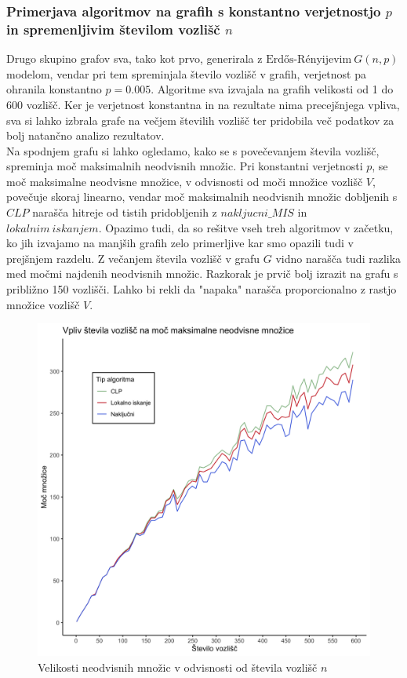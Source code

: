 \documentclass[a4paper, 12pt]{article}
\begin{document}
\subsubsection{Primerjava algoritmov na grafih s konstantno verjetnostjo $p$ in spremenljivim številom vozlišč $n$}

Drugo skupino grafov sva, tako kot prvo, generirala z $\text{Erdős-Rényijevim}\ G(n, p)$ modelom, vendar pri tem spreminjala število vozlišč v grafih, verjetnost pa ohranila konstantno $p=0.005$.
Algoritme sva izvajala na grafih velikosti od 1 do 600 vozlišč. Ker je verjetnost konstantna in na rezultate nima precejšnjega vpliva, sva si lahko izbrala grafe na večjem številih vozlišč ter pridobila več podatkov za bolj natančno analizo rezultatov.\\

\noindent Na spodnjem grafu si lahko ogledamo, kako se s povečevanjem števila vozlišč, spreminja moč maksimalnih neodvisnih množic. Pri konstantni verjetnosti $p$, se moč maksimalne neodvisne množice, v odvisnosti od 
moči množice vozlišč $V$, povečuje skoraj linearno, vendar moč maksimalnih neodvisnih množic dobljenih s $CLP$ narašča hitreje od tistih pridobljenih z $nakljucni\_MIS$ in
$lokalnim\ iskanjem$. Opazimo tudi, da so rešitve vseh treh algoritmov v začetku, ko jih izvajamo na manjših grafih zelo primerljive kar smo opazili tudi v prejšnjem razdelu. Z večanjem 
števila vozlišč v grafu $G$ vidno narašča tudi razlika med močmi najdenih neodvisnih množic. Razkorak je prvič bolj izrazit na grafu s približno 150 vozlišči. Lahko bi rekli da "napaka" narašča proporcionalno z rastjo množice vozlišč $V$.


\begin{figure}[h!]
	\begin{center}
		\includegraphics[scale=0.12]{R_koda/voz-moc.png}
		\caption{Velikosti neodvisnih množic v odvisnosti od števila vozlišč $n$}
	\end{center}
\end{figure}
\end{document}
